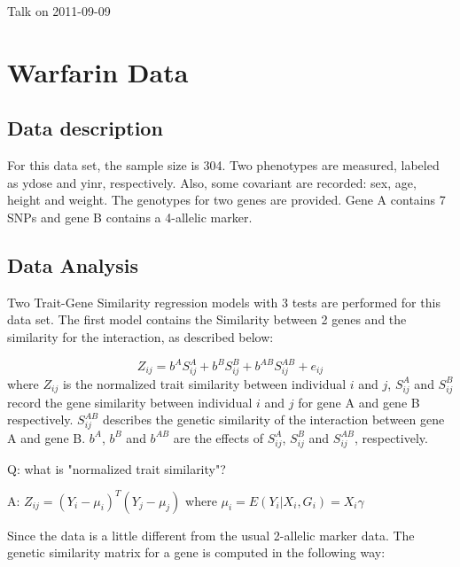 \documentclass{article}
\begin{document}
    \begin{center}
        \Large{Talk on 2011-09-09}
    \end{center}

    \fontsize{11pt}{\baselineskip}\selectfont

    \section{Warfarin Data}

    \subsection{Data description}

        For this data set, the sample size is 304. Two phenotypes are measured, labeled as ydose and yinr, respectively. Also, some covariant are recorded: sex, age, height and weight. The genotypes for two genes are provided. Gene A contains 7 SNPs and gene B contains a 4-allelic marker.

    \subsection{Data Analysis}

        Two Trait-Gene Similarity regression models with 3 tests are performed for this data set. The first model contains the Similarity between 2 genes and the similarity for the interaction, as described below:

        \begin{equation*}
            Z_{ij}=b^AS_{ij}^A+b^BS_{ij}^B+b^{AB}S_{ij}^{AB}+e_{ij}
        \end{equation*}
        where $Z_{ij}$ is the normalized trait similarity between individual $i$ and $j$, $S^A_{ij}$ and $S^B_{ij}$ record the gene similarity between individual $i$ and $j$ for gene A and gene B respectively. $S^{AB}_{ij}$ describes the genetic similarity of the interaction between gene A and gene B. $b^A$, $b^B$ and $b^{AB}$ are the effects of $S^A_{ij}$, $S^B_{ij}$ and $S^{AB}_{ij}$, respectively.\\
        \begin{boxedminipage}{\textwidth}
            Q: what is "normalized trait similarity"?
            
            A: $Z_{ij}=(Y_i-\mu_i)^T(Y_j-\mu_j)$ where $\mu_i=E(Y_i|X_i,G_i)=X_i\gamma$
        \end{boxedminipage}

        Since the data is a little different from the usual 2-allelic marker data. The genetic similarity matrix for a gene is computed in the following way:
\end{document}
